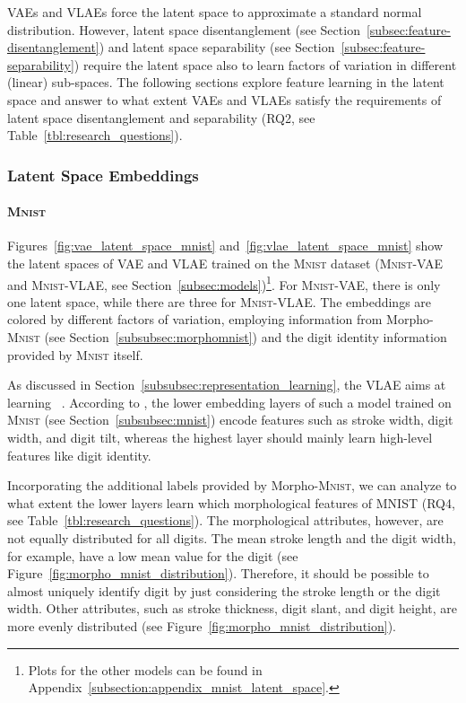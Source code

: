 \acp{VAE} and \acp{VLAE} force the latent space to approximate a standard normal distribution.
However, latent space disentanglement (see Section~\ref{subsec:feature-disentanglement}) and latent space separability (see Section~\ref{subsec:feature-separability}) require the latent space also to learn factors of variation in different (linear) sub-spaces.
The following sections explore feature learning in the latent space and answer to what extent \acp{VAE} and \acp{VLAE} satisfy the requirements of latent space disentanglement and separability (RQ2, see Table~\ref{tbl:research_questions}).

\subsubsection{Latent Space Embeddings}\label{subsubsec:latent_space_embeddings}

\paragraph{\textsc{Mnist}}

Figures~\ref{fig:vae_latent_space_mnist} and~\ref{fig:vlae_latent_space_mnist} show the latent spaces of \ac{VAE} and \ac{VLAE} trained on the \textsc{Mnist} dataset (\textsc{Mnist}-\ac{VAE} and \textsc{Mnist}-\ac{VLAE}, see Section~\ref{subsec:models})\footnote{Plots for the other models can be found in Appendix~\ref{subsection:appendix_mnist_latent_space}.}.
For \textsc{Mnist}-\ac{VAE}, there is only one latent space, while there are three for \textsc{Mnist}-\ac{VLAE}.
The embeddings are colored by different factors of variation, employing information from Morpho-\textsc{Mnist} (see Section~\ref{subsubsec:morphomnist}) and the digit identity information provided by \textsc{Mnist} itself.

As discussed in Section~\ref{subsubsec:representation_learning}, the \ac{VLAE} aims at learning ~\citep{zhao2017learning}.
According to \citet{zhao2017learning}, the lower embedding layers of such a model trained on \textsc{Mnist} (see Section~\ref{subsubsec:mnist}) encode features such as stroke width, digit width, and digit tilt, whereas the highest layer should mainly learn high-level features like digit identity.

Incorporating the additional labels provided by Morpho-\textsc{Mnist}, we can analyze to what extent the lower layers learn which morphological features of \textsc{MNIST} (RQ4, see Table~\ref{tbl:research_questions}).
The morphological attributes, however, are not equally distributed for all digits.
The mean stroke length and the digit width, for example, have a low mean value for the digit  (see Figure~\ref{fig:morpho_mnist_distribution}).
Therefore, it should be possible to almost uniquely identify digit  by just considering the stroke length or the digit width.
Other attributes, such as stroke thickness, digit slant, and digit height, are more evenly distributed (see Figure~\ref{fig:morpho_mnist_distribution}).

